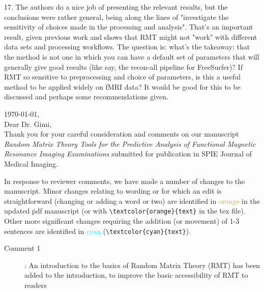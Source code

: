 \documentclass[10pt,letter]{article}
\begin{document}
{%




17. The authors do a nice job of presenting the relevant results, but the
conclusions were rather general, being along the lines of "investigate the
sensitivity of choices made in the processing and analysis". That's an
important result, given previous work and shows that RMT might not "work" with
different data sets and processing workflows. The question is: what's the
takeaway: that the method is not one in which you can have a default set of
parameters that will generally give good results (like say, the recon-all
pipeline for FreeSurfer)? If RMT so sensitive to preprocessing and choice of
parameters, is this a useful method to be applied widely on fMRI data? It would
be good for this to be discussed and perhaps some recommendations given.
}

\noindent
\today, \\
Dear Dr. Gimi, \\

Thank you for your careful consideration and comments on our manuscript
\emph{Random Matrix Theory Tools for the Predictive Analysis of Functional
Magnetic Resonance Imaging Examinations} submitted for publication in SPIE
Journal of Medical Imaging.

In response to reviewer comments, we have made a number of changes to the
manuscript. Minor changes relating to wording or for which an edit is
straightforward (changing or adding a word or two) are identified in
\textcolor{orange}{orange} in the updated \.pdf manuscript (or with
\verb|\textcolor{orange}{text}| in the \.tex file). Other more significant
changes requiring the addition (or movement) of 1-3 sentences are identified
in \textcolor{cyan}{cyan} (\verb|\textcolor{cyan}{text}|).

\begin{description}
\item[Comment 1]: An introduction to the basics of Random Matrix Theory (RMT) has been
added to the introduction, to improve the basic accessibility of RMT to readers
\end{description}
\end{document}
